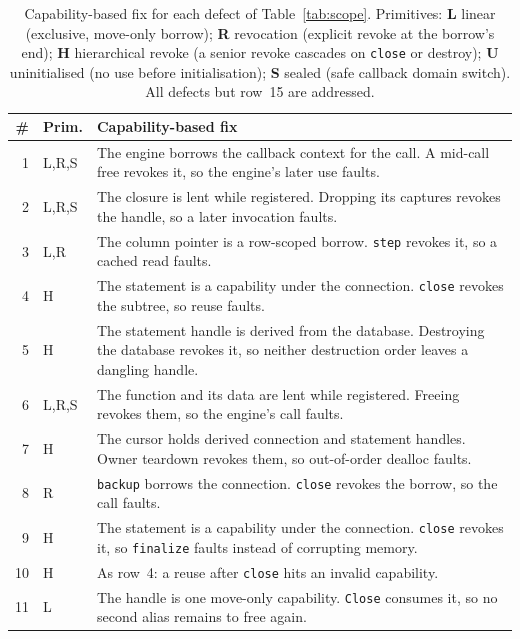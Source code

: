 \documentclass[10pt,twocolumn]{article}
\begin{document}
\begin{table}[t]
\centering
\caption{Capability-based fix for each defect of Table~\ref{tab:scope}.
Primitives: \textbf{L} linear (exclusive, move-only borrow); \textbf{R}
revocation (explicit revoke at the borrow's end); \textbf{H} hierarchical revoke
(a senior revoke cascades on \texttt{close} or destroy); \textbf{U} uninitialised
(no use before initialisation); \textbf{S} sealed (safe callback domain switch).
All defects but row~15 are addressed.}
\label{tab:fix}
\footnotesize
\renewcommand{\arraystretch}{1.15}
\setlength{\tabcolsep}{5pt}
\begin{tabular}{@{}r l p{14.2cm}@{}}
\toprule
\textbf{\#} & \textbf{Prim.} & \textbf{Capability-based fix} \\
\midrule
1  & L,R,S & The engine borrows the callback context for the call. A mid-call free revokes it, so the engine's later use faults. \\
2  & L,R,S & The closure is lent while registered. Dropping its captures revokes the handle, so a later invocation faults. \\
3  & L,R   & The column pointer is a row-scoped borrow. \texttt{step} revokes it, so a cached read faults. \\
4  & H     & The statement is a capability under the connection. \texttt{close} revokes the subtree, so reuse faults. \\
5  & H     & The statement handle is derived from the database. Destroying the database revokes it, so neither destruction order leaves a dangling handle. \\
6  & L,R,S & The function and its data are lent while registered. Freeing revokes them, so the engine's call faults. \\
7  & H     & The cursor holds derived connection and statement handles. Owner teardown revokes them, so out-of-order dealloc faults. \\
8  & R     & \texttt{backup} borrows the connection. \texttt{close} revokes the borrow, so the call faults. \\
9  & H     & The statement is a capability under the connection. \texttt{close} revokes it, so \texttt{finalize} faults instead of corrupting memory. \\
10 & H     & As row~4: a reuse after \texttt{close} hits an invalid capability. \\
11 & L     & The handle is one move-only capability. \texttt{Close} consumes it, so no second alias remains to free again. \\

\end{tabular}
\end{table}
\end{document}
